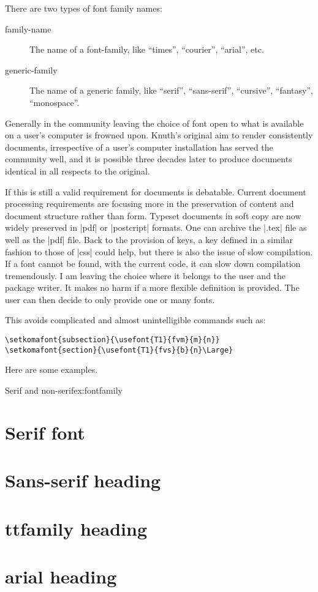 There are two types of font family names:

\begin{description}
\item[family-name] The name of a font-family, like “times”, “courier”, “arial”, etc.
\item[generic-family] The name of a generic family, like “serif”, “sans-serif”, “cursive”, “fantasy”, “monospace”.
\end{description}

Generally in the \tex community leaving the choice of font  open to what is available on a user’s computer is frowned upon. Knuth’s original aim to render consistently documents, irrespective of a user’s computer installation has served the community well, and it is possible three decades later to produce documents identical in all respects to the original. 

If this is still a valid requirement for documents is debatable. Current document processing requirements are focusing more in the preservation of content and document structure rather than form. Typeset documents in soft copy are now widely preserved in |pdf| or |postcript|  formats. One can archive the |.tex| file as well as the |pdf| file.  Back to the provision of keys, a key defined in a 
similar fashion to those of |css| could help, but there is also the issue of slow compilation. If a font cannot be
found, with the current code, it can slow down compilation tremendously. I am leaving the choice where it belongs to the user and the package writer. It makes no harm if a more flexible definition is provided. The user can then decide to only provide one or many fonts. 

This avoids complicated and almost unintelligible commands such as:

\begin{verbatim}
\setkomafont{subsection}{\usefont{T1}{fvm}{m}{n}}
\setkomafont{section}{\usefont{T1}{fvs}{b}{n}\Large}
\end{verbatim}

Here are some examples. 

\begin{texexample}{Serif and non-serif}{ex:fontfamily}
\chapter{Serif font}
\lorem
{}
\chapter{Sans-serif heading}
\lorem
{}
\chapter{ttfamily heading}
\lorem
{}
\chapter{arial heading}
\lorem
\end{texexample}


